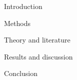 \documentclass[12pt]{article}
\begin{document}
{Introduction}

{Methods}

{Theory and literature}

{Results and discussion}

{Conclusion}
\end{document}
